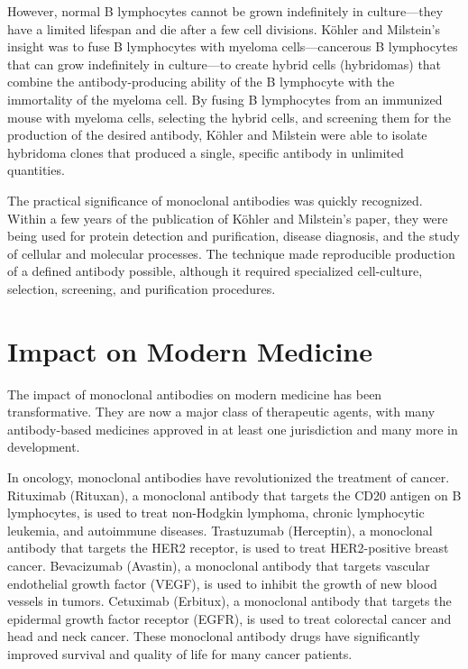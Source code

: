 However, normal B lymphocytes cannot be grown indefinitely in culture---they have a limited lifespan and die after a few cell divisions. K\"ohler and Milstein's insight was to fuse B lymphocytes with myeloma cells---cancerous B lymphocytes that can grow indefinitely in culture---to create hybrid cells (hybridomas) that combine the antibody-producing ability of the B lymphocyte with the immortality of the myeloma cell. By fusing B lymphocytes from an immunized mouse with myeloma cells, selecting the hybrid cells, and screening them for the production of the desired antibody, K\"ohler and Milstein were able to isolate hybridoma clones that produced a single, specific antibody in unlimited quantities.

The practical significance of monoclonal antibodies was quickly recognized. Within a few years of the publication of K\"ohler and Milstein's paper, they were being used for protein detection and purification, disease diagnosis, and the study of cellular and molecular processes. The technique made reproducible production of a defined antibody possible, although it required specialized cell-culture, selection, screening, and purification procedures.

\section{Impact on Modern Medicine}

The impact of monoclonal antibodies on modern medicine has been transformative. They are now a major class of therapeutic agents, with many antibody-based medicines approved in at least one jurisdiction and many more in development.

In oncology, monoclonal antibodies have revolutionized the treatment of cancer. Rituximab (Rituxan), a monoclonal antibody that targets the CD20 antigen on B lymphocytes, is used to treat non-Hodgkin lymphoma, chronic lymphocytic leukemia, and autoimmune diseases. Trastuzumab (Herceptin), a monoclonal antibody that targets the HER2 receptor, is used to treat HER2-positive breast cancer. Bevacizumab (Avastin), a monoclonal antibody that targets vascular endothelial growth factor (VEGF), is used to inhibit the growth of new blood vessels in tumors. Cetuximab (Erbitux), a monoclonal antibody that targets the epidermal growth factor receptor (EGFR), is used to treat colorectal cancer and head and neck cancer. These monoclonal antibody drugs have significantly improved survival and quality of life for many cancer patients.

